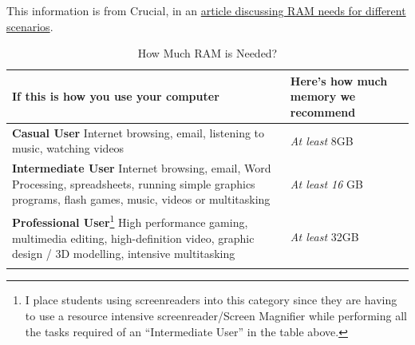 \documentclass[14pt, letterpaper,twoside]{extreport}
\begin{document}
This information is from Crucial, in an \href{https://www.crucial.com/articles/about-memory/how-much-ram-does-my-computer-need}{article discussing RAM needs for different scenarios}.

\begin{longtable}[]{@{}
	>{\raggedright\arraybackslash}p{}
	>{\raggedright\arraybackslash}p{}@{}
	}
	\toprule\noalign{}

	\textbf{If this is how you use your computer}                                                                                                                                                                                                                                                                                                                                                         & \textbf{Here's how much memory we recommend} \\
	\midrule\noalign{}
	\endhead
	\bottomrule\noalign{}
	\endlastfoot
	\textbf{Casual User} \break Internet browsing, email, listening to music, watching videos                                                                                                                                                                                                                                                                                                             & \emph{At least} 8GB                          \\[1.5em]
	\textbf{Intermediate User} \break Internet browsing, email, Word Processing, spreadsheets, running simple graphics programs, flash games, music, videos or multitasking                                                                                                                                                                                                                               & \emph{At least 16} GB                        \\[1.5em]
	\textbf{Professional User}\footnote{I place students using screenreaders into this category since they are having to use a resource intensive screenreader/Screen Magnifier while performing all the tasks required of an ``Intermediate User'' in the table above.} \break High performance gaming, multimedia editing, high-definition video, graphic design / 3D modelling, intensive multitasking & \emph{At least} 32GB                         \\[1.5em] \hline
	\caption{How Much RAM is Needed?}
\end{longtable}
\end{document}
